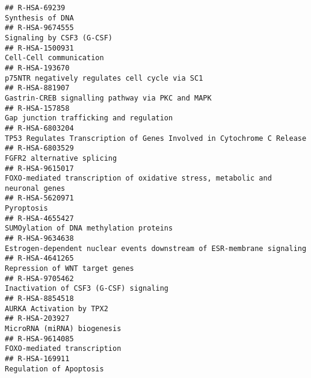 \documentclass[
]{article}
\begin{document}
\begin{verbatim}
## R-HSA-69239                                                                                                                       Synthesis of DNA
## R-HSA-9674555                                                                                                            Signaling by CSF3 (G-CSF)
## R-HSA-1500931                                                                                                              Cell-Cell communication
## R-HSA-193670                                                                                        p75NTR negatively regulates cell cycle via SC1
## R-HSA-881907                                                                                      Gastrin-CREB signalling pathway via PKC and MAPK
## R-HSA-157858                                                                                               Gap junction trafficking and regulation
## R-HSA-6803204                                                               TP53 Regulates Transcription of Genes Involved in Cytochrome C Release
## R-HSA-6803529                                                                                                           FGFR2 alternative splicing
## R-HSA-9615017                                                        FOXO-mediated transcription of oxidative stress, metabolic and neuronal genes
## R-HSA-5620971                                                                                                                           Pyroptosis
## R-HSA-4655427                                                                                              SUMOylation of DNA methylation proteins
## R-HSA-9634638                                                               Estrogen-dependent nuclear events downstream of ESR-membrane signaling
## R-HSA-4641265                                                                                                       Repression of WNT target genes
## R-HSA-9705462                                                                                               Inactivation of CSF3 (G-CSF) signaling
## R-HSA-8854518                                                                                                             AURKA Activation by TPX2
## R-HSA-203927                                                                                                           MicroRNA (miRNA) biogenesis
## R-HSA-9614085                                                                                                          FOXO-mediated transcription
## R-HSA-169911                                                                                                               Regulation of Apoptosis

\end{verbatim}
\end{document}
